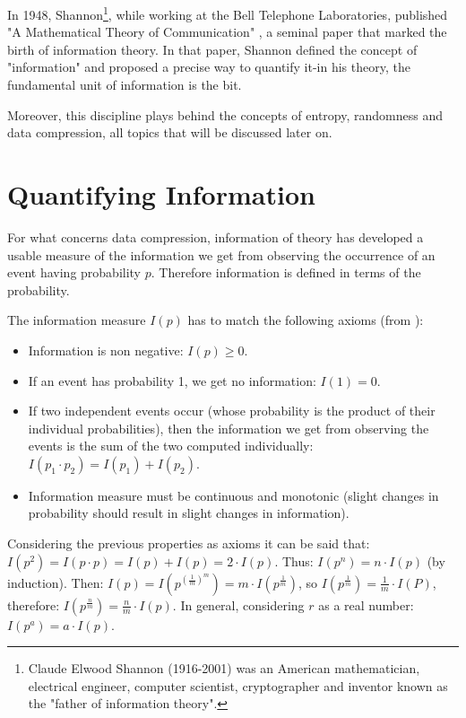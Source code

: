 \documentclass[12pt, a4paper]{report}
\begin{document}
In 1948, Shannon\footnote{Claude Elwood Shannon (1916-2001) was an American mathematician, electrical engineer, computer
scientist, cryptographer and inventor known as the "father of information theory".}, while working at the Bell Telephone
Laboratories, published "A Mathematical Theory of Communication" \cite{AMathematicalTheoryOfCommunication}, a seminal paper that
marked the birth of information theory. In that paper, Shannon defined the concept of "information" and proposed a precise way to
quantify it-in his theory, the fundamental unit of information is the bit.

Moreover, this discipline plays behind the concepts of entropy, randomness and data compression, all topics that will be discussed
later on.

\section{Quantifying Information}

For what concerns data compression, information of theory has developed a usable measure of the information we get from observing
the occurrence of an event having probability \(p\). Therefore information is defined in terms of the probability.

The information measure \(I(p)\) has to match the following axioms (from \cite{AnIntroductionToInformationTheoryAndEntropy}):

\begin{itemize}
  \item Information is non negative: \(I(p) \geq 0\).
  \item If an event has probability 1, we get no information: \(I(1) = 0\).
  \item If two independent events occur (whose probability is the product of their individual probabilities), then the information
  we get from observing the events is the sum of the two computed individually: \(I(p_1 \cdot p_2) = I(p_1) + I(p_2)\).
  \item Information measure must be continuous and monotonic (slight changes in probability should result in slight changes in
  information).
\end{itemize}

Considering the previous properties as axioms it can be said that: \(I(p^2) = I(p \cdot p) = I(p) + I(p) = 2 \cdot I(p)\).
Thus: \(I(p^n) = n \cdot I(p)\) (by induction).
Then: \(I(p) = I(p^{(\frac{1}{m})^m}) = m \cdot I(p^{\frac{1}{m}})\), so \(I(p^{\frac{1}{m}}) = \frac{1}{m} \cdot I(P)\),
therefore: \(I(p^{\frac{n}{m}}) = \frac{n}{m} \cdot I(p)\).
In general, considering \(r\) as a real number: \(I(p^a) = a \cdot I(p)\).
\end{document}
